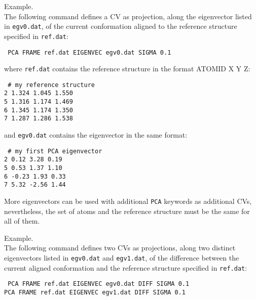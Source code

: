 \documentclass[12pt,fleqn]{report}
\newcommand{\keyword}[1]{\index{Keywords!{\tt #1}} {\tt #1}}
\newcommand{\esempio}[1]{
\vspace{10pt}
\begin{flushright}
\colorbox{light-gray}{
   \begin{minipage}{13cm}
       \scriptsize{
{\fontfamily{phv} \fontseries{b}
 \selectfont Example. \\
 \fontseries{m} \selectfont #1 } }
\end{minipage}}
\end{flushright}
\vspace{20pt}
}
\begin{document}
\esempio{The following command defines a CV as projection, along the eigenvector listed in {\tt egv0.dat}, of the current conformation aligned to the reference structure specified in {\tt ref.dat}:

 

\vspace{10pt}
 {\tt
PCA FRAME ref.dat EIGENVEC egv0.dat SIGMA 0.1\\}

\vspace{5pt}

where {\tt ref.dat} contains the reference structure in the format ATOMID X Y Z:

{\tt 
\# my reference structure\\
2   1.324   1.045   1.550\\
5   1.316   1.174   1.469\\
6   1.345   1.174   1.350\\
7   1.287   1.286   1.538}

\vspace{5pt}

and {\tt egv0.dat} contains the eigenvector in the same format:

{\tt 
\# my first PCA eigenvector\\
2  0.12 3.28 0.19\\
5  0.53 1.37 1.10\\
6 -0.23 1.93 0.33\\
7 5.32 -2.56 1.44}\\
}

More eigenvectors can be used with additional \keyword{PCA} keywords as additional CVs, nevertheless, the set of atoms and the reference structure must be the same for all of them.
 \esempio{The following command defines two CVs as projections, along two distinct eigenvectors listed in {\tt egv0.dat} and {\tt egv1.dat}, of the difference between the current aligned conformation and the reference structure specified in {\tt ref.dat}:

\vspace{10pt}
 {\tt
PCA FRAME ref.dat EIGENVEC egv0.dat DIFF SIGMA 0.1\\
PCA FRAME ref.dat EIGENVEC egv1.dat DIFF SIGMA 0.1\\}

}
\end{document}
